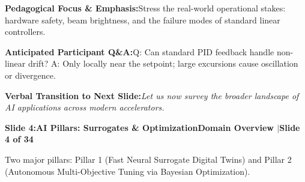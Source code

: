 \documentclass[11pt,a4paper]{article}
\begin{document}
\begin{tcolorbox}[colback=lightbg,colframe=bordergray,left=6pt,right=6pt,top=3pt,bottom=3pt,boxrule=0.6pt,arc=2.5pt]
\small
\noindent\textbf{\color{navy}Pedagogical Focus \& Emphasis:}\enspace Stress the real-world operational stakes: hardware safety, beam brightness, and the failure modes of standard linear controllers.\par\vspace{0.3em}
\noindent\textbf{\color{successgreen}Anticipated Participant Q\&A:}\enspace Q: Can standard PID feedback handle non-linear drift? A: Only locally near the setpoint; large excursions cause oscillation or divergence.\par\vspace{0.3em}
\noindent\textbf{\color{accent}Verbal Transition to Next Slide:}\enspace \emph{Let us now survey the broader landscape of AI applications across modern accelerators.}
\end{tcolorbox}
\clearpage
\hypertarget{slide.4}{}
{}
\noindent\begin{tcolorbox}[colback=navy,colframe=navy,left=6pt,right=6pt,top=3pt,bottom=3pt,boxrule=0pt,arc=2pt]
{\large\bfseries\color{white}Slide 4:\enspace AI Pillars: Surrogates \& Optimization}\hfill{\footnotesize\bfseries\color{white!85!lightbg}Domain Overview \enspace$|$\enspace Slide 4 of 34}
\end{tcolorbox}
\vspace{0.2em}
\begin{tcolorbox}[colback=lightbg,colframe=bordergray,title={\footnotesize\bfseries\color{darkgray}Slide Visual Blueprint},fontupper=\small,left=6pt,right=6pt,top=2.5pt,bottom=2.5pt,boxrule=0.6pt,arc=2.5pt]
Two major pillars: Pillar 1 (Fast Neural Surrogate Digital Twins) and Pillar 2 (Autonomous Multi-Objective Tuning via Bayesian Optimization).
\end{tcolorbox}
\vspace{0.2em}
\end{document}
